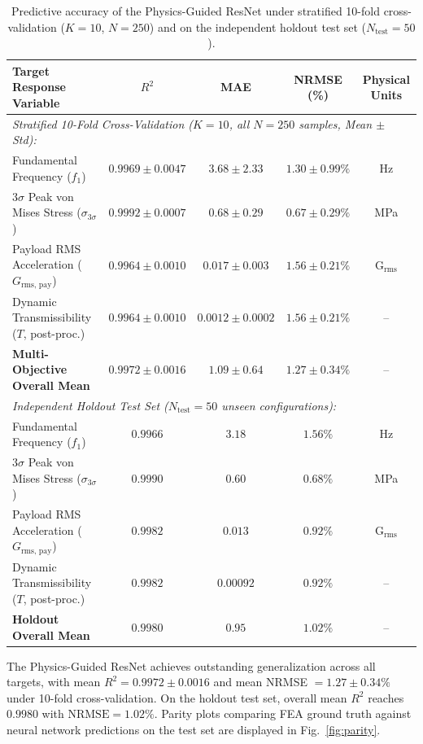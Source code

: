 \documentclass[preprint,12pt,3p]{elsarticle}
\newcommand{\Grmspay}{G_{\text{rms, pay}}}
\begin{document}
\begin{table}[htb]
  \centering
  \caption{Predictive accuracy of the Physics-Guided ResNet under stratified 10-fold cross-validation ($K = 10$, $N = 250$) and on the independent holdout test set ($N_{\text{test}} = 50$).}
  \label{tab:test_metrics}
  \small
  \begin{tabular}{l c c c c}
    \toprule
    \textbf{Target Response Variable} & \textbf{$R^2$} & \textbf{MAE} & \textbf{NRMSE (\%)} & \textbf{Physical Units} \\
    \midrule
    \multicolumn{5}{l}{\textit{Stratified 10-Fold Cross-Validation ($K = 10$, all $N = 250$ samples, Mean $\pm$ Std):}} \\
    Fundamental Frequency ($f_1$) & $0.9969 \pm 0.0047$ & $3.68 \pm 2.33$ & $1.30 \pm 0.99\%$ & \si{Hz} \\
    $3\sigma$ Peak von Mises Stress ($\sigma_{3\sigma}$) & $0.9992 \pm 0.0007$ & $0.68 \pm 0.29$ & $0.67 \pm 0.29\%$ & \si{MPa} \\
    Payload RMS Acceleration ($\Grmspay$) & $0.9964 \pm 0.0010$ & $0.017 \pm 0.003$ & $1.56 \pm 0.21\%$ & $\text{G}_{\text{rms}}$ \\
    Dynamic Transmissibility ($T$, post-proc.) & $0.9964 \pm 0.0010$ & $0.0012 \pm 0.0002$ & $1.56 \pm 0.21\%$ & -- \\
    \textbf{Multi-Objective Overall Mean} & $\mathbf{0.9972 \pm 0.0016}$ & $\mathbf{1.09 \pm 0.64}$ & $\mathbf{1.27 \pm 0.34\%}$ & -- \\
    \midrule
    \multicolumn{5}{l}{\textit{Independent Holdout Test Set ($N_{\text{test}} = 50$ unseen configurations):}} \\
    Fundamental Frequency ($f_1$) & $0.9966$ & $3.18$ & $1.56\%$ & \si{Hz} \\
    $3\sigma$ Peak von Mises Stress ($\sigma_{3\sigma}$) & $0.9990$ & $0.60$ & $0.68\%$ & \si{MPa} \\
    Payload RMS Acceleration ($\Grmspay$) & $0.9982$ & $0.013$ & $0.92\%$ & $\text{G}_{\text{rms}}$ \\
    Dynamic Transmissibility ($T$, post-proc.) & $0.9982$ & $0.00092$ & $0.92\%$ & -- \\
    \textbf{Holdout Overall Mean} & $\mathbf{0.9980}$ & $\mathbf{0.95}$ & $\mathbf{1.02\%}$ & -- \\
    \bottomrule
  \end{tabular}
\end{table}

The Physics-Guided ResNet achieves outstanding generalization across all targets, with mean $R^2 = 0.9972 \pm 0.0016$ and mean NRMSE $= 1.27 \pm 0.34\%$ under 10-fold cross-validation. On the holdout test set, overall mean $R^2$ reaches $0.9980$ with $\text{NRMSE} = 1.02\%$. Parity plots comparing FEA ground truth against neural network predictions on the test set are displayed in Fig.~\ref{fig:parity}.
\end{document}
